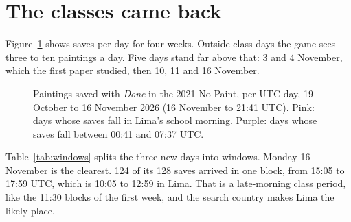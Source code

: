 \documentclass[10pt,letterpaper,twocolumn]{article}
\begin{document}
\section{The classes came back}

Figure~\ref{fig:days} shows saves per day for four weeks. Outside class days the game sees three to ten paintings a day. Five days stand far above that: 3 and 4 November, which the first paper studied, then 10, 11 and 16 November.

\begin{figure}[t]
\centering
{}
\caption{Paintings saved with \emph{Done} in the 2021 No Paint, per UTC day, 19 October to 16 November 2026 (16 November to 21:41 UTC). Pink: days whose saves fall in Lima's school morning. Purple: days whose saves fall between 00:41 and 07:37 UTC.}
\label{fig:days}
\end{figure}

Table~\ref{tab:windows} splits the three new days into windows. Monday 16 November is the clearest. 124 of its 128 saves arrived in one block, from 15:05 to 17:59 UTC, which is 10:05 to 12:59 in Lima. That is a late-morning class period, like the 11:30 blocks of the first week, and the search country makes Lima the likely place.
\end{document}
